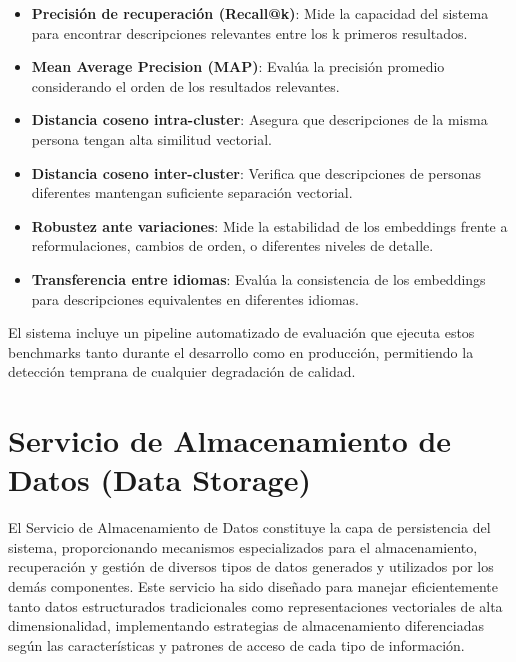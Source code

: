 \documentclass[12pt,a4paper]{article}
\begin{document}
\begin{itemize}
    \item \textbf{Precisión de recuperación (Recall@k)}: Mide la capacidad del sistema para encontrar descripciones relevantes entre los k primeros resultados.
    
    \item \textbf{Mean Average Precision (MAP)}: Evalúa la precisión promedio considerando el orden de los resultados relevantes.
    
    \item \textbf{Distancia coseno intra-cluster}: Asegura que descripciones de la misma persona tengan alta similitud vectorial.
    
    \item \textbf{Distancia coseno inter-cluster}: Verifica que descripciones de personas diferentes mantengan suficiente separación vectorial.
    
    \item \textbf{Robustez ante variaciones}: Mide la estabilidad de los embeddings frente a reformulaciones, cambios de orden, o diferentes niveles de detalle.
    
    \item \textbf{Transferencia entre idiomas}: Evalúa la consistencia de los embeddings para descripciones equivalentes en diferentes idiomas.
\end{itemize}

El sistema incluye un pipeline automatizado de evaluación que ejecuta estos benchmarks tanto durante el desarrollo como en producción, permitiendo la detección temprana de cualquier degradación de calidad.

\section{Servicio de Almacenamiento de Datos (Data Storage)}
\label{sec:data-storage}

El Servicio de Almacenamiento de Datos constituye la capa de persistencia del sistema, proporcionando mecanismos especializados para el almacenamiento, recuperación y gestión de diversos tipos de datos generados y utilizados por los demás componentes. Este servicio ha sido diseñado para manejar eficientemente tanto datos estructurados tradicionales como representaciones vectoriales de alta dimensionalidad, implementando estrategias de almacenamiento diferenciadas según las características y patrones de acceso de cada tipo de información.
\end{document}

